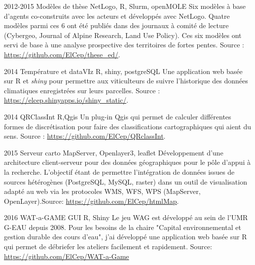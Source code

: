 \documentclass[]{cv-etienne}
\begin{document}
\begin{entrylist}
\entry
{2012-2015}
{Modèles de thèse}
{NetLogo, R, Slurm, openMOLE}
{
Six modèles à base d'agents co-construits avec les acteurs et développés avec NetLogo. Quatre modèles parmi ces 6 ont été publiés dans des journaux à comité de lecture (Cybergeo, Journal of Alpine Research, Land Use Policy). Ces six modèles ont servi de base à une analyse prospective des territoires de fortes pentes.  Source : \url{https://github.com/ElCep/these_ed/}.
}
\end{entrylist}
\begin{entrylist}
\entry
{2014}
{Température et dataVIz}
{R, shiny, postgreSQL}
{
Une application web basée sur R et \textit{shiny} pour permettre aux viticulteurs de suivre l'historique des données climatiques enregistrées sur leurs parcelles. Source : \url{https://elcep.shinyapps.io/shiny_static/}.
}
\end{entrylist}
\begin{entrylist}
\entry
{2014}
{QRClassInt}
{R,Qgis}
{
Un plug-in Qgis qui permet de calculer différentes formes de discrétisation pour faire des classifications cartographiques qui aient du sens.  Source : \url{https://github.com/ElCep/QRclassInt}.
}
\end{entrylist}
\begin{entrylist}
\entry
{2015}
{Serveur carto}
{MapServer, Openlayer3, leaflet}
{
Développement d'une architecture client-serveur pour des données géographiques pour le pôle d'appui à la recherche. L'objectif étant de permettre l'intégration de données issues de sources hétérogènes (PostgreSQL, MySQL, raster) dans un outil de visualisation adapté au web via les protocoles WMS, WFS, WPS (MapServer, OpenLayer).Source: \url{https://github.com/ElCep/htmlMap}.
}
\end{entrylist}
\begin{entrylist}
\entry
{2016}
{WAT-a-GAME GUI}
{R, Shiny}
{
Le jeu WAG est développé au sein de l'UMR G-EAU depuis 2008. Pour les besoins de la chaire "Capital environnemental et gestion durable des cours d'eau", j'ai développé une application web basée sur R qui permet de débriefer les ateliers facilement et rapidement. Source: \url{https://github.com/ElCep/WAT-a-Game}
}
\end{entrylist}
\end{document}
